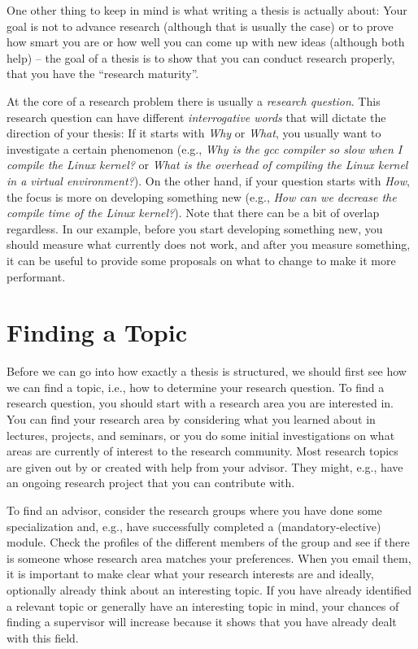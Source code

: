 \documentclass[a4]{article}
\begin{document}
One other thing to keep in mind is what writing a thesis is actually about:
Your goal is not to advance research (although that is usually the case) or to prove how smart you are or how well you can come up with new ideas (although both help) -- the goal of a thesis is to show that you can conduct research properly, that you have the ``research maturity''.

At the core of a research problem there is usually a \emph{research question}.
This research question can have different \emph{interrogative words} that will dictate the direction of your thesis:
If it starts with \emph{Why} or \emph{What}, you usually want to investigate a certain phenomenon (e.g., \emph{Why is the gcc compiler so slow when I compile the Linux kernel?} or \emph{What is the overhead of compiling the Linux kernel in a virtual environment?}).
On the other hand, if your question starts with \emph{How}, the focus is more on developing something new (e.g., \emph{How can we decrease the compile time of the Linux kernel?}).
Note that there can be a bit of overlap regardless.
In our example, before you start developing something new, you should measure what currently does not work, and after you measure something, it can be useful to provide some proposals on what to change to make it more performant.

\section{Finding a Topic}
\label{sec:topic}

Before we can go into how exactly a thesis is structured, we should first see how we can find a topic, i.e., how to determine your research question.
To find a research question, you should start with a research area you are interested in.
You can find your research area by considering what you learned about in lectures, projects, and seminars, or you do some initial investigations on what areas are currently of interest to the research community.
Most research topics are given out by or created with help from your advisor.
They might, e.g., have an ongoing research project that you can contribute with.

To find an advisor, consider the research groups where you have done some specialization and, e.g., have successfully completed a (mandatory-elective) module.
Check the profiles of the different members of the group and see if there is someone whose research area matches your preferences.
When you email them, it is important to make clear what your research interests are and ideally, optionally already think about an interesting topic.
If you have already identified a relevant topic or generally have an interesting topic in mind, your chances of finding a supervisor will increase because it shows that you have already dealt with this field.
\end{document}
